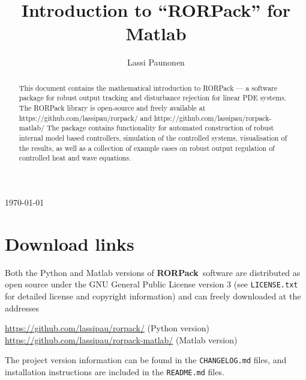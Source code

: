 \documentclass[11pt, a4paper]{amsart}
\theoremstyle{definition}
\numberwithin{equation}{section}
\newcommand{\RORname}{\textbf{RORPack}}
\newcommand{\RORnameplain}{RORPack}
\newcommand{\shorten}[1]{{\color{gray}#1}}
\renewcommand{\shorten}[1]{}
\begin{document}
\title[Introduction to ``\RORnameplain'']{Introduction to ``\RORname'' for Matlab\\[1ex]\footnotesize{}}
\thispagestyle{plain}

\author{Lassi Paunonen}
\address{Department of Mathematics, Tampere University, PO.\ Box 692, 33101 Tampere, Finland}


\maketitle

\vspace{-3ex}

\begin{center}
  \today
\end{center}

\vspace{3ex}

\begin{abstract}
  This document contains the mathematical introduction to RORPack --- a software package for robust output tracking and disturbance rejection for linear PDE systems. The RORPack library is open-source and freely available at 
https://github.com/lassipau/rorpack/ and
https://github.com/lassipau/rorpack-matlab/
The package contains functionality for automated construction of robust internal model based controllers, simulation of the controlled systems, visualisation of the results, as well as a collection of example cases on robust output regulation of controlled heat and wave equations.
\end{abstract}

{\small\tableofcontents}


\section*{Download links}


Both the Python and Matlab versions of \RORname\ software are distributed as open source under the GNU General Public License version 3 (see \texttt{LICENSE.txt} for detailed license and copyright information) and can freely downloaded at the addresses
\begin{flushleft}
 \hspace{1.6cm} \href{https://github.com/lassipau/rorpack/}{https://github.com/lassipau/rorpack/} \hspace{1.4cm} (Python version)\\
 \hspace{1.6cm}  \href{https://github.com/lassipau/rorpack-matlab/}{https://github.com/lassipau/rorpack-matlab/} \hspace{.1cm} (Matlab version)
\end{flushleft}
The project version information can be found in the \texttt{CHANGELOG.md} files, and installation instructions are included in the \texttt{README.md} files.
\end{document}
